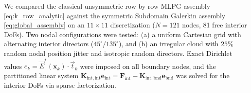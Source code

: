 \documentclass[VANCOUVER,Times1COL]{WileyNJD-v5}
\begin{document}
We compared the classical unsymmetric row-by-row MLPG assembly \eqref{eq:k_row_analytic} against the symmetric Subdomain Galerkin assembly \eqref{eq:global_assembly} on an $11 \times 11$ discretization ($N = 121$ nodes, 81 free interior DoFs). Two nodal configurations were tested: (a) a uniform Cartesian grid with alternating interior directors ($45^\circ / 135^\circ$), and (b) an irregular cloud with $25\%$ random nodal position jitter and isotropic random directors. Exact Dirichlet values $e_k = \vec{E}^*(\mathbf{x}_k) \cdot \vec{t}_k$ were imposed on all boundary nodes, and the partitioned linear system $\mathbf{K}_{\mathrm{int}, \mathrm{int}} \mathbf{e}_{\mathrm{int}} = \mathbf{F}_{\mathrm{int}} - \mathbf{K}_{\mathrm{int}, \mathrm{bnd}} \mathbf{e}_{\mathrm{bnd}}$ was solved for the interior DoFs via sparse factorization.
\end{document}
